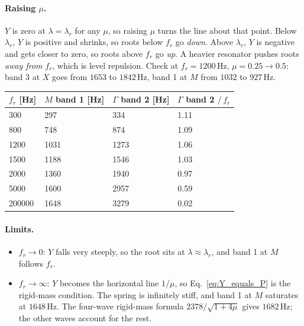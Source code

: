 \paragraph{Raising $\mu$.}
$Y$ is zero at $\lambda = \lambda_r$ for any $\mu$, so raising $\mu$ turns the
line about that point. Below $\lambda_r$, $Y$ is positive and shrinks, so roots
below $f_r$ go \emph{down}. Above $\lambda_r$, $Y$ is negative and gets closer to
zero, so roots above $f_r$ go \emph{up}. A heavier resonator pushes roots
\emph{away from} $f_r$, which is level repulsion. Check at $f_r = 1200\,\mathrm{Hz}$,
$\mu = 0.25 \to 0.5$: band 3 at $X$ goes from $1653$ to $1842\,\mathrm{Hz}$, band 1
at $M$ from $1032$ to $927\,\mathrm{Hz}$.

\begin{center}
\begin{tabular}{|l|l|l|l|}
\hline
$f_r$ [Hz] & $M$ band 1 [Hz] & $\Gamma$ band 2 [Hz] & $\Gamma$ band 2 $/\, f_r$ \\
\hline
300 & 297 & 334 & 1.11 \\
800 & 748 & 874 & 1.09 \\
1200 & 1031 & 1273 & 1.06 \\
1500 & 1188 & 1546 & 1.03 \\
2000 & 1360 & 1940 & 0.97 \\
5000 & 1600 & 2957 & 0.59 \\
200000 & 1648 & 3279 & 0.02 \\
\hline
\end{tabular}
\end{center}

\paragraph{Limits.}
\begin{itemize}
  \item $f_r \to 0$: $Y$ falls very steeply, so the root sits at
        $\lambda \approx \lambda_r$, and band 1 at $M$ follows $f_r$.
  \item $f_r \to \infty$: $Y$ becomes the horizontal line $1/\mu$, so
        Eq.~\eqref{eq:Y_equals_P} is the rigid-mass condition. The spring is
        infinitely stiff, and band 1 at $M$ saturates at $1648\,\mathrm{Hz}$. The
        four-wave rigid-mass formula $2378/\sqrt{1+4\mu}$ gives
        $1682\,\mathrm{Hz}$; the other waves account for the rest.
\end{itemize}

